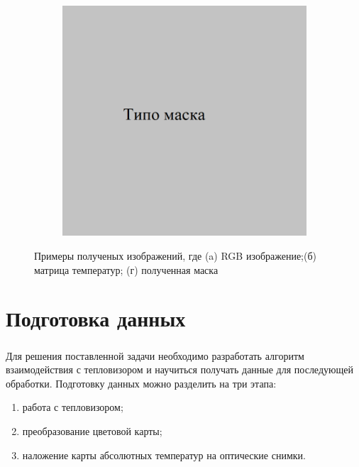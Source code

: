 \documentclass[t]{beamer}
\begin{document}
\begin{frame}
\begin{figure}[ht!]
\begin{subfigure}{.23\textwidth}
			\caption{}
		\end{subfigure}
		\begin{subfigure}{.23\textwidth}
			\centering
			\includegraphics[width = \textwidth]{image/mask}
			\caption{}
		\end{subfigure}
		\centering
		\caption{Примеры полученых изображений, где (a) RGB изображение;(б) матрица температур; (г) полученная маска}
		\label{fig:Examples}
	\end{figure}
	\end{frame}

\section{Подготовка данных}

	\begin{frame}
		\frametitle{\insertsection} 
		Для решения поставленной задачи необходимо разработать алгоритм взаимодействия с тепловизором и научиться получать данные для последующей обработки. Подготовку данных можно разделить на три этапа:
		\begin{enumerate}
			\item работа с тепловизором;
			\item преобразование цветовой карты;
			\item наложение карты абсолютных температур на оптические снимки.
		\end{enumerate}
	\end{frame}
\end{document}
